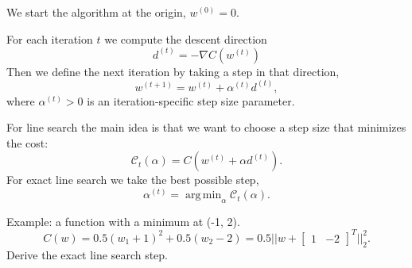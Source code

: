 \documentclass{article}
\DeclareMathOperator*{\argmin}{arg\,min}
\begin{document}
We start the algorithm at the origin, $w^{(0)}=0$.

For each iteration $t$ we compute the descent direction 
\begin{equation}
  \label{eq:descent-direction}
  d^{(t)} = -\nabla C(w^{(t)})
\end{equation}
Then we define the next iteration by taking a step in that direction,
\begin{equation}
  \label{eq:gradient-step}
  w^{(t+1)} = w^{(t)} + \alpha^{(t)} d^{(t)},
\end{equation}
where $\alpha^{(t)}>0$ is an iteration-specific step size parameter.

For line search the main idea is that we want to choose a step
size that minimizes the cost:
\begin{equation}
  \label{eq:line-search-cost}
  \mathcal C_t(\alpha) = C(w^{(t)} + \alpha d^{(t)}).
\end{equation}
For exact line search we take the best possible step,
\begin{equation}
  \label{eq:exact-line-search}
  \alpha^{(t)} = \argmin_\alpha \mathcal C_t(\alpha).
\end{equation}

Example: a function with a minimum at (-1, 2).
\begin{equation}
  C(w) = 0.5(w_1 +1)^2 + 0.5 (w_2-2) = 0.5||w + \left[
    \begin{array}{cc}
      1&-2
    \end{array}
\right]^T ||_2^2.
\end{equation}
Derive the exact line search step.
\end{document}
